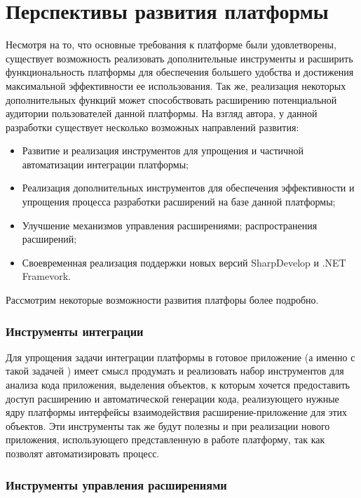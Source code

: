 \section{Перспективы развития платформы}

Несмотря на то, что основные требования к платформе были удовлетворены, существует возможность реализовать дополнительные инструменты и расширить функциональность платформы для обеспечения большего удобства и достижения максимальной эффективности ее использования. Так же, реализация некоторых дополнительных функций может способствовать расширению потенциальной аудитории пользователей данной платформы. На взгляд автора, у данной разработки существует несколько возможных направлений развития:

\begin{itemize}
   \item Развитие и реализация инструментов для упрощения и частичной автоматизации интеграции платформы;
   \item Реализация дополнительных инструментов для обеспечения эффективности и упрощения процесса разработки расширений на базе данной платформы;
   \item Улучшение механизмов управления расширениями; распространения расширений;
   \item Своевременная реализация поддержки новых версий SharpDevelop и .NET Framevork.
\end{itemize}

Рассмотрим некоторые возможности развития платфоры более подробно.

\subsubsection{Инструменты интеграции}

Для упрощения задачи интеграции платформы в готовое приложение (а именно с такой задачей ) имеет смысл продумать и реализовать набор инструментов для анализа кода приложения, выделения объектов, к которым хочется предоставить доступ расширению и автоматической генерации кода, реализующего нужные ядру платформы интерфейсы взаимодействия расширение-приложение для этих объектов. Эти инструменты так же будут полезны и при реализации нового приложения, использующего представленную в работе платформу, так как позволят автоматизировать процесс.

\subsubsection{Инструменты управления расширениями}

